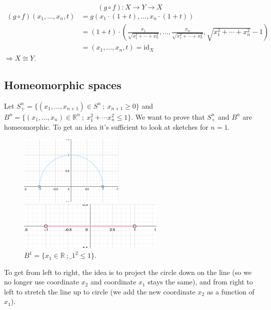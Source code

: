 \documentclass[a4paper,11pt]{article}
\begin{document}
$$ (g \circ f): X \to Y \to X$$
\begin{align*} 
    (g \circ f)(x_1, \ldots, x_n, t) &= g \left( x_1 \cdot (1 + t), \ldots, x_n \cdot (1 + t) \right) \\
    &= (1 + t) \cdot \left( \frac{x_1}{ \sqrt{x_1^2 + \cdots + x_n^2}}, \ldots, \frac{x_n}{ \sqrt{x_1^2 + \cdots + x_n^2}}, \sqrt{x_1^2 + \cdots + x_n^2} - 1 \right) \\
    &= (x_1, \ldots, x_n, t) = \text{id}_X
\end{align*}
\noindent 
$ \Longrightarrow X \cong Y $.

\subsection{Homeomorphic spaces}

Let $S_{+}^{n} = \{ (x_1, \ldots , x_{n+1}) \in S^n \ ; \ x_{n + 1} \geq 0\}$ and $B^n = \{ (x_1, \ldots, x_n) \in \mathbb{R}^n \ ; \ x_1^2 + \cdots x_n^2 \leq 1\}$. We want to prove that $S_{+}^{n}$ and $B^n$ are homeomorphic.
To get an idea it's sufficient to look at sketches for $n = 1$.

\begin{figure}[ht]
    \begin{minipage}{0.5\textwidth}
         \centering
         \includegraphics[width=50mm]{X_n1_2.png}
         \caption{$S_{+}^{1} = \{ (x_1, x_2)\in S^1 \ ; \ x_{2} \geq 0\}$.}
    \end{minipage}\hfill
    \begin{minipage}{0.5\textwidth}
         \centering
         \includegraphics[width=70mm]{Y_n1_2.png}
         \caption{$B^1 = \{ x_1 \in \mathbb{R} \ ; \_1^2  \leq 1\}$.}
    \end{minipage}\hfill
\end{figure}
\noindent
To get from left to right, the idea is to project the circle down on the line (so we no longer use coordinate $x_2$ and coordinate $x_1$ stays the same), and from right to left to stretch the line up to circle (we add the new coordinate $x_2$ as a function of $x_1$). 
\end{document}
